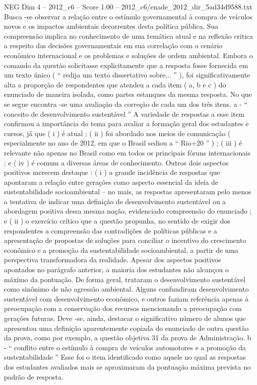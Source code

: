 \begin{textsample}{NEG Dim 4 – 2012\_c6 – Score 1.00 – 2012\_c6/enade\_2012\_dir\_5ad34d9588.txt}
Busca -se observar a relação entre o estímulo governamental à compra de veículos novos e os impactos ambientais decorrentes desta política pública.
Sua compreensão implica no conhecimento de uma temática atual e na reflexão critica a respeito das decisões governamentais em sua correlação com o cenário econômico internacional e os problemas e soluções de ordem ambiental.
Embora o comando da questão solicitasse explicitamente que a resposta fosse fornecida em um texto único ( “ redija um texto dissertativo sobre... ” ), foi significativamente alta a proporção de respondentes que atendeu a cada item ( a, b e c ) do enunciado de maneira isolada, como partes estanques da mesma resposta.
No que se segue encontra -se uma avaliação da correção de cada um dos três itens. a - “ conceito de desenvolvimento sustentável ” A variedade de respostas a esse item confirmou a importância do tema para avaliar a formação geral dos estudantes e cursos, já que ( i ) é atual ; ( ii ) foi abordado nos meios de comunicação ( especialmente no ano de 2012, em que o Brasil sediou a “ Rio+20 ” ) ; ( iii ) é relevante não apenas no Brasil como em todos os principais fóruns internacionais ; e ( iv ) é comum a diversas áreas de conhecimento.
Outros dois aspectos positivos merecem destaque : ( i ) a grande incidência de respostas que apontaram a relação entre gerações como aspecto essencial da ideia de sustentabilidade socioambiental – no mais, as respostas apresentaram pelo menos a tentativa de indicar uma definição de desenvolvimento sustentável ou a abordagem positiva dessa mesma noção, evidenciado compreensão do enunciado ; e ( ii ) o exercício crítico que a questão propunha, no sentido de exigir dos respondentes a compreensão das contradições de políticas públicas e a apresentação de propostas de soluções para conciliar o incentivo do crescimento econômico e a promoção da sustentabilidade socioambiental, a partir de uma perspectiva transformadora da realidade.
Apesar dos aspectos positivos apontados no parágrafo anterior, a maioria dos estudantes não alcançou o máximo da pontuação.
De forma geral, trataram o desenvolvimento sustentável como sinônimo de não agressão ambiental.
Alguns confundiram desenvolvimento sustentável com desenvolvimento econômico, e outros faziam referência apenas à preocupação com a conservação dos recursos mencionando a preocupação com gerações futuras.
Deve -se, ainda, destacar o significativo número de alunos que apresentou uma definição aparentemente copiada do enunciado de outra questão da prova, como por exemplo, a questão objetiva 31 da prova de Administração. b - “ conflito entre o estímulo à compra de veículos automotores e a promoção da sustentabilidade ” Esse foi o item identificado como aquele no qual as respostas dos estudantes avaliados mais se aproximaram da pontuação máxima prevista no padrão de resposta.

\end{textsample}
